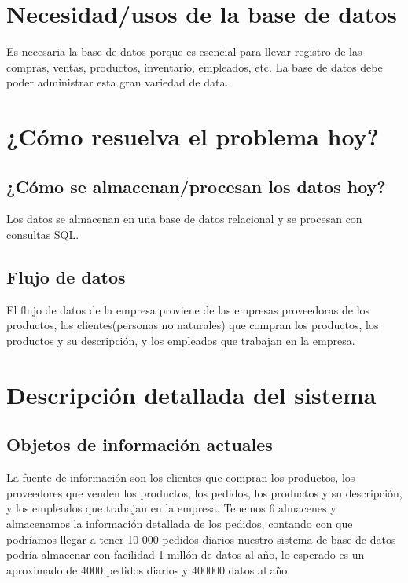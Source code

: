\documentclass[10pt, a4paper,openany]{report}
\begin{document}
\section{Necesidad/usos de la base de datos}
\label{sec:Necesidad/usos de la base de datos}

Es necesaria la base de datos porque es esencial para llevar registro de las compras, ventas, productos, inventario, empleados, etc. La base de datos debe poder administrar esta gran variedad de data.

\section{¿Cómo resuelva el problema hoy?}
\label{sec:¿Cómo resuelva el problema hoy?}

\subsection{¿Cómo se almacenan/procesan los datos hoy?}
\label{subsec:¿Cómo se almacenan/procesan los datos hoy?}

Los datos se almacenan en una base de datos relacional y se procesan con consultas SQL.

\subsection{Flujo de datos}
\label{subsec:Flujo de datos}

El flujo de datos de la empresa proviene de las empresas proveedoras de los productos, los clientes(personas no naturales) que compran los productos, los productos y su descripción, y los empleados que trabajan en la empresa.

\pagebreak

\section{Descripción detallada del sistema}
\label{sec:Descripción detallada del sistema}

\subsection{Objetos de información actuales }
\label{subsec:Objetos de información actuales }

La fuente de información son los clientes que compran los productos, los proveedores que venden los productos, los pedidos, los productos y su descripción, y los empleados que trabajan en la empresa. Tenemos 6 almacenes y almacenamos la información detallada de los pedidos, contando con que podríamos llegar a tener 10 000 pedidos diarios nuestro sistema de base de datos podría almacenar con facilidad 1 millón de datos al año, lo esperado es un aproximado de 4000 pedidos diarios y 400000 datos al año.
\end{document}
